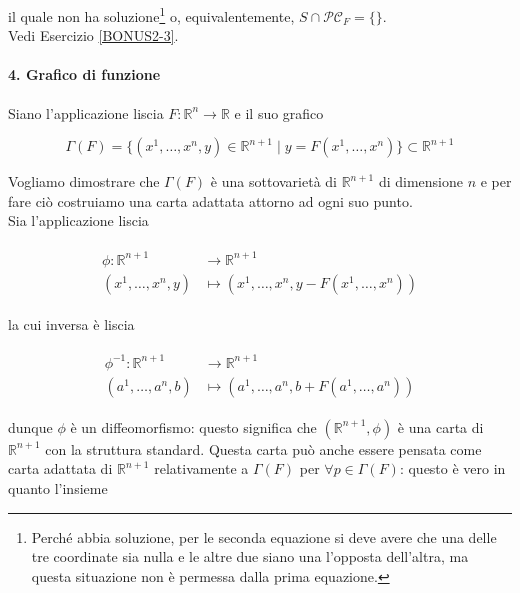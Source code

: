 il quale non ha soluzione\footnote{%
	Perché abbia soluzione, per le seconda equazione si deve avere che una delle tre coordinate sia nulla e le altre due siano una l'opposta dell'altra, ma questa situazione non è permessa dalla prima equazione.%
} o, equivalentemente, $ S \cap \mathcal{PC}_{F} = \{\} $.\\
Vedi Esercizio \ref{BONUS2-3}.

\paragraph{4. Grafico di funzione}

Siano l'applicazione liscia $ F : \mathbb{R}^{n} \to \mathbb{R} $ e il suo grafico

\begin{equation}
	\Gamma(F) = \{ (x^{1},\dots,x^{n},y) \in \mathbb{R}^{n+1} \mid y = F(x^{1},\dots,x^{n}) \} \subset \mathbb{R}^{n+1}
\end{equation}

Vogliamo dimostrare che $ \Gamma(F) $ è una sottovarietà di $ \mathbb{R}^{n+1} $ di dimensione $ n $ e per fare ciò costruiamo una carta adattata attorno ad ogni suo punto.\\
Sia l'applicazione liscia

\begin{align}
	\begin{split}
		\phi : \mathbb{R}^{n+1} &\to \mathbb{R}^{n+1}\\
		(x^{1},\dots,x^{n},y) &\mapsto (x^{1},\dots,x^{n},y - F(x^{1},\dots,x^{n}))
	\end{split}
\end{align}

la cui inversa è liscia

\begin{align}
	\begin{split}
		\phi^{-1} : \mathbb{R}^{n+1} &\to \mathbb{R}^{n+1}\\
		(a^{1},\dots,a^{n},b) &\mapsto (a^{1},\dots,a^{n},b + F(a^{1},\dots,a^{n}))
	\end{split}
\end{align}

dunque $ \phi $ è un diffeomorfismo: questo significa che $ (\mathbb{R}^{n+1},\phi) $ è una carta di $ \mathbb{R}^{n+1} $ con la struttura standard. Questa carta può anche essere pensata come carta adattata di $ \mathbb{R}^{n+1} $ relativamente a $ \Gamma(F) $ per $ \forall p \in \Gamma(F) $: questo è vero in quanto l'insieme

